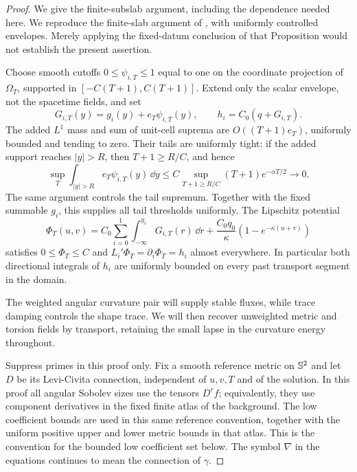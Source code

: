\begin{proof}
We give the finite-subslab argument, including the dependence needed
here.  We reproduce the finite-slab argument of
\cite[, proof]{KerrCTwo}, with uniformly
controlled envelopes.  Merely applying the fixed-datum conclusion of
that Proposition would not establish the present assertion.

Choose smooth cutoffs $0\le\psi_{i,T}\le1$ equal to one on the coordinate projection
of $\Omega_T$, supported in $[-C(T+1),C(T+1)]$.  Extend only the
scalar envelope, not the spacetime fields, and set
\begin{equation}\label{dn:uniform-envelopes}
 G_{i,T}(y)=g_i(y)+e_T\psi_{i,T}(y),
                       \qquad h_i=C_0(q+G_{i,T}).
\end{equation}
The added $L^1$ mass and sum of unit-cell suprema are
$O((T+1)e_T)$, uniformly bounded and tending to zero.  Their tails
are uniformly tight: if the added support reaches $|y|>R$, then
$T+1\ge R/C$, and hence
\[
 \sup_T\int_{|y|>R}e_T\psi_{i,T}(y)\,\dd y
 \le C\sup_{T+1\ge R/C}(T+1)e^{-\alpha T/2}\longrightarrow0.
\]
The same argument controls the tail supremum.  Together with the
fixed summable $g_i$, this supplies all tail thresholds uniformly.
The Lipschitz potential
\begin{equation}\label{dn:bounded-potential}
 \Phi_T(u,v)=C_0\sum_{i=0}^1\int_{-\infty}^{y_i}G_{i,T}(r)\,\dd r
       +\frac{C_0q_0}{\kappa}(1-e^{-\kappa(u+v)})
\end{equation}
satisfies $0\le\Phi_T\le C$ and
$L_i'\Phi_T=\partial_i\Phi_T=h_i$ almost everywhere.
In particular both directional integrals of $h_i$ are uniformly
bounded on every past transport segment in the domain.

The weighted angular curvature pair will supply stable fluxes, while
trace damping controls the shape trace. We will then recover unweighted
metric and torsion fields by transport, retaining the small lapse in the
curvature energy throughout.

Suppress primes in this proof only.  Fix a smooth reference metric on
$\mathbb S^2$ and let $D$ be its Levi-Civita connection, independent of
$u,v,T$ and of the solution.  In this proof all angular Sobolev sizes
use the tensors $D^r f$; equivalently, they use component derivatives
in the fixed finite atlas of the background.  The low coefficient
bounds are used in this same reference convention, together with the
uniform positive upper and lower metric bounds in that atlas.  This is
the convention for the bounded low coefficient set below.  The symbol
$\nabla$ in the equations continues to mean the connection of
$\gamma$.


\end{proof}
